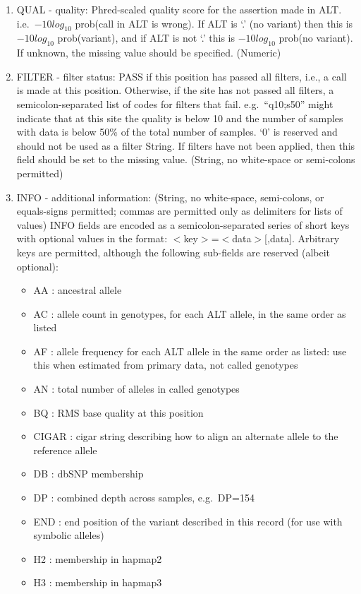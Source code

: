 \documentclass[8pt]{article}
\begin{document}
\begin{enumerate}
  \item QUAL - quality: Phred-scaled quality score for the assertion made in ALT. i.e.\ $-10log_{10}$ prob(call in ALT is wrong). If ALT is `.' (no variant) then this is $-10log_{10}$ prob(variant), and if ALT is not `.' this is $-10log_{10}$ prob(no variant). If unknown, the missing value should be specified. (Numeric)
  \item FILTER - filter status: PASS if this position has passed all filters, i.e., a call is made at this position. Otherwise, if the site has not passed all filters, a semicolon-separated list of codes for filters that fail. e.g.\ ``q10;s50'' might indicate that at this site the quality is below 10 and the number of samples with data is below 50\% of the total number of samples. `0' is reserved and should not be used as a filter String. If filters have not been applied, then this field should be set to the missing value. (String, no white-space or semi-colons permitted)
  \item INFO - additional information: (String, no white-space, semi-colons, or equals-signs permitted; commas are permitted only as delimiters for lists of values) INFO fields are encoded as a semicolon-separated series of short keys with optional values in the format: $<$key$>$=$<$data$>$[,data]. Arbitrary keys are permitted, although the following sub-fields are reserved (albeit optional):
\begin{itemize}
  \item AA : ancestral allele
  \item AC : allele count in genotypes, for each ALT allele, in the same order as listed
  \item AF : allele frequency for each ALT allele in the same order as listed: use this when estimated from primary data, not called genotypes
  \item AN : total number of alleles in called genotypes
  \item BQ : RMS base quality at this position
  \item CIGAR : cigar string describing how to align an alternate allele to the reference allele
  \item DB : dbSNP membership
  \item DP : combined depth across samples, e.g.\ DP=154
  \item END : end position of the variant described in this record (for use with symbolic alleles)
  \item H2 : membership in hapmap2
  \item H3 : membership in hapmap3

\end{itemize}
\end{enumerate}
\end{document}
